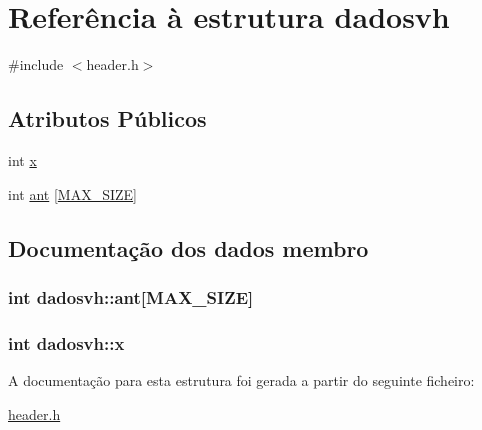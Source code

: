 \hypertarget{structdadosvh}{\section{Referência à estrutura dadosvh}
\label{structdadosvh}
}


{\ttfamily \#include $<$header.\-h$>$}

\subsection*{Atributos Públicos}
\begin{DoxyCompactItemize}
\item 
int \hyperlink{structdadosvh_aa9f141b7d4d66748afee78fb10a8363d}{x}
\item 
int \hyperlink{structdadosvh_a5aa921bdfa9d82ac22f87c45bbbcdc30}{ant} \mbox{[}\hyperlink{header_8h_a0592dba56693fad79136250c11e5a7fe}{M\-A\-X\-\_\-\-S\-I\-Z\-E}\mbox{]}
\end{DoxyCompactItemize}


\subsection{Documentação dos dados membro}
\hypertarget{structdadosvh_a5aa921bdfa9d82ac22f87c45bbbcdc30}{
\subsubsection[{ant}]{\setlength{\rightskip}{0pt plus 5cm}int dadosvh\-::ant\mbox{[}{\bf M\-A\-X\-\_\-\-S\-I\-Z\-E}\mbox{]}}}\label{structdadosvh_a5aa921bdfa9d82ac22f87c45bbbcdc30}
\hypertarget{structdadosvh_aa9f141b7d4d66748afee78fb10a8363d}{
\subsubsection[{x}]{\setlength{\rightskip}{0pt plus 5cm}int dadosvh\-::x}}\label{structdadosvh_aa9f141b7d4d66748afee78fb10a8363d}


A documentação para esta estrutura foi gerada a partir do seguinte ficheiro\-:\begin{DoxyCompactItemize}
\item 
\hyperlink{header_8h}{header.\-h}\end{DoxyCompactItemize}
